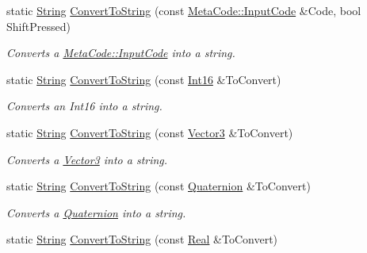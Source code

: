 \begin{DoxyCompactItemize}
static \hyperlink{namespaceMezzanine_acf9fcc130e6ebf08e3d8491aebcf1c86}{String} \hyperlink{classMezzanine_1_1StringTool_a6c6ae7843b5ab368f997ed400c9a9aa5}{ConvertToString} (const \hyperlink{classMezzanine_1_1MetaCode_a3b5633f0145bf3287cf53a3f05b5563c}{MetaCode::InputCode} \&Code, bool ShiftPressed)
\begin{DoxyCompactList}\small\item\em Converts a \hyperlink{classMezzanine_1_1MetaCode_a3b5633f0145bf3287cf53a3f05b5563c}{MetaCode::InputCode} into a string. \item\end{DoxyCompactList}\item 
static \hyperlink{namespaceMezzanine_acf9fcc130e6ebf08e3d8491aebcf1c86}{String} \hyperlink{classMezzanine_1_1StringTool_a87b8d888f2ab2ec5a07e6bbfe37c2f6a}{ConvertToString} (const \hyperlink{namespaceMezzanine_adb602bffcbc8f1b381b2f529e9e364f6}{Int16} \&ToConvert)
\begin{DoxyCompactList}\small\item\em Converts an Int16 into a string. \item\end{DoxyCompactList}\item 
static \hyperlink{namespaceMezzanine_acf9fcc130e6ebf08e3d8491aebcf1c86}{String} \hyperlink{classMezzanine_1_1StringTool_a57186e27bc1c5f3fb81f38b1b7de4228}{ConvertToString} (const \hyperlink{classMezzanine_1_1Vector3}{Vector3} \&ToConvert)
\begin{DoxyCompactList}\small\item\em Converts a \hyperlink{classMezzanine_1_1Vector3}{Vector3} into a string. \item\end{DoxyCompactList}\item 
static \hyperlink{namespaceMezzanine_acf9fcc130e6ebf08e3d8491aebcf1c86}{String} \hyperlink{classMezzanine_1_1StringTool_a18622cda9566c17d50287086dcf03b2b}{ConvertToString} (const \hyperlink{classMezzanine_1_1Quaternion}{Quaternion} \&ToConvert)
\begin{DoxyCompactList}\small\item\em Converts a \hyperlink{classMezzanine_1_1Quaternion}{Quaternion} into a string. \item\end{DoxyCompactList}\item 
static \hyperlink{namespaceMezzanine_acf9fcc130e6ebf08e3d8491aebcf1c86}{String} \hyperlink{classMezzanine_1_1StringTool_a87c96f44624cff22342f79ca9667330c}{ConvertToString} (const \hyperlink{namespaceMezzanine_a726731b1a7df72bf3583e4a97282c6f6}{Real} \&ToConvert)

\end{DoxyCompactItemize}
